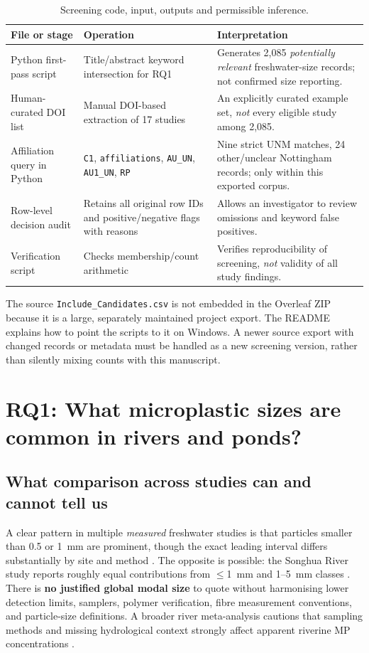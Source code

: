 \documentclass[10pt,a4paper]{article}
\begin{document}
\begin{table}[H]\centering\small
\caption{Screening code, input, outputs and permissible inference.}\label{tab:reproduce}
\begin{tabularx}{\linewidth}{@{}p{3.0cm}p{4.2cm}X@{}}\toprule
File or stage & Operation & Interpretation \\\midrule
Python first-pass script & Title/abstract keyword intersection for RQ1 & Generates 2,085 \emph{potentially relevant} freshwater-size records; not confirmed size reporting.\\
Human-curated DOI list & Manual DOI-based extraction of 17 studies & An explicitly curated example set, \emph{not} every eligible study among 2,085.\\
Affiliation query in Python & \texttt{C1}, \texttt{affiliations}, \texttt{AU\_UN}, \texttt{AU1\_UN}, \texttt{RP} & Nine strict UNM matches, 24 other/unclear Nottingham records; only within this exported corpus.\\
Row-level decision audit & Retains all original row IDs and positive/negative flags with reasons & Allows an investigator to review omissions and keyword false positives.\\
Verification script & Checks membership/count arithmetic & Verifies reproducibility of screening, \emph{not} validity of all study findings.\\
\bottomrule\end{tabularx}
\end{table}

The source \texttt{Include\_Candidates.csv} is not embedded in the Overleaf ZIP because it is a large, separately maintained project export. The README explains how to point the scripts to it on Windows. A newer source export with changed records or metadata must be handled as a new screening version, rather than silently mixing counts with this manuscript.

\section{RQ1: What microplastic sizes are common in rivers and ponds?}
\subsection{What comparison across studies can and cannot tell us}
A clear pattern in multiple \emph{measured} freshwater studies is that particles smaller than 0.5 or 1~mm are prominent, though the exact leading interval differs substantially by site and method \cite{Corpus15,Corpus05,Corpus17,Corpus11,Corpus04}. The opposite is possible: the Songhua River study reports roughly equal contributions from $\leq$1~mm and 1--5~mm classes \cite{Corpus10}. There is \textbf{no justified global modal size} to quote without harmonising lower detection limits, samplers, polymer verification, fibre measurement conventions, and particle-size definitions. A broader river meta-analysis cautions that sampling methods and missing hydrological context strongly affect apparent riverine MP concentrations \cite{Lofty2023}.
\end{document}
